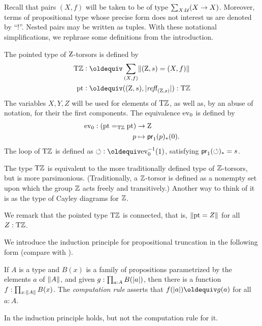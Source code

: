\documentclass[a4paper,12pt]{amsart}
\begin{document}
Recall that pairs $(X,f)$ will be taken to be of type $\sum_{X:\mathcal{U}}(X\to X)$.
Moreover, terms of propositional type whose precise form does not interest us are denoted by ``$!$''.
Nested pairs may be written as tuples.
With these notational simplifications, we rephrase some definitions from the introduction.

\begin{definition}\label{def:TorZ}
  The pointed type of $\mathrm{Z}$-torsors is defined by
  \begin{align*}
    \TorZ &\defeq \sum_{(X,f)}\Trunc{(\zet,s)=(X,f)}  \\
    \pt & \defeq ((\zet,s),\trunc{\refl{(\zet,s)}}) : \TorZ
  \end{align*}
  The variables $X,Y,Z$ will be used for elements of ${\mathrm{T}\mathbb{Z}}$, 
  as well as, by an abuse of notation, for their the first components.
  The equivalence $\mathrm{ev}_0$ is defined by
  \begin{align*}
    \mathrm{ev}_0: ({\mathord{\mathrm{pt}}} =_{\mathrm{T}\mathbb{Z}} {\mathord{\mathrm{pt}}}) & \to\mathrm{Z} \\
    p & \mapsto \mathsf{pr}_1(p)_*(0).
  \end{align*}
  The loop of ${\mathrm{T}\mathbb{Z}}$ is defined as ${\Zloop}\defeq\ev_0^{-1}(1)$,
  satisfying $\mathsf{pr}_1(\circlearrowleft)_* = s$.
\end{definition}

The type ${\mathrm{T}\mathbb{Z}}$ is equivalent to the more traditionally defined 
type of $\mathbb{Z}$-torsors, but is more parsimonious.
(Traditionally, a $\mathbb{Z}$-torsor is defined as a nonempty set upon which the group $\mathbb{Z}$ acts freely and transitively.)
Another way to think of it is as the type of Cayley diagrams for $\mathbb{Z}$.

We remark that the pointed type ${\mathrm{T}\mathbb{Z}}$ is connected, that is, $\lVert{\mathord{\mathrm{pt}}}=Z\rVert$ for all $Z:{\mathrm{T}\mathbb{Z}}$.

We introduce the induction principle for propositional truncation in the following form (compare with \cite[Ch. 6.9]{hottbook}).

\begin{definition}\label{def:proptruncind}
  If $A$ is a type and $B(x)$ is a family of propositions parametrized by the elements $a$ of $\lVert A\rVert$,
  and given $g : \prod_{a:A} B(\lvert a\rvert)$, then there is a function $f : \prod_{x:\lVert A\rVert} B(x)$.
  The \emph{computation rule} asserts that $f (\trunc a) \jdeq g(a)$ for all $a:A$.
\end{definition}

In {\UniMath} the induction principle holds, but not the computation rule for it.
\end{document}
